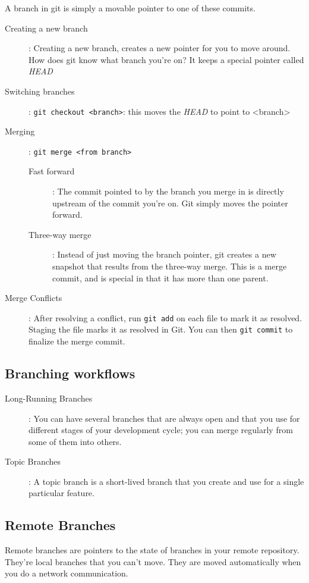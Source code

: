 \documentclass[french]{article}
\begin{document}
A branch in git is simply a movable pointer to one of these commits.

\begin{description}
  \item[Creating a new branch]: Creating a new branch, creates a new pointer for you to move around. How does git know what branch you're on? It keeps a special pointer called \emph{HEAD}
  \item[Switching branches]: \lstinline{git checkout <branch>}: this moves the \emph{HEAD} to point to <branch>
  \item[Merging]: \lstinline{git merge <from branch>}
    \begin{description}
      \item[Fast forward]: The commit pointed to by the branch you merge in is directly upstream of the commit you're on. Git simply moves the pointer forward.
      \item[Three-way merge]: Instead of just moving the branch pointer, git creates a new snapshot that results from the three-way merge. This is a merge commit, and is special in that it has more than one parent.
    \end{description}
  \item[Merge Conflicts]: After resolving a conflict, run \lstinline{git add} on each file to mark it as resolved. Staging the file marks it as resolved in Git. You can then \lstinline{git commit} to finalize the merge commit.
\end{description}

\subsection{Branching workflows}

\begin{description}
  \item[Long-Running Branches]: You can have several branches that are always open and that you use for different stages of your development cycle; you can merge regularly from some of them into others.
  \item[Topic Branches]: A topic branch is a short-lived branch that you create and use for a single particular feature.
\end{description}

\subsection{Remote Branches}
Remote branches are pointers to the state of branches in your remote repository. They're local branches that you can't move. They are moved automatically when you do a network communication.
\end{document}
